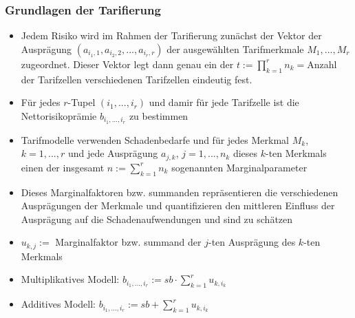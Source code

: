 \documentclass[12pt]{report}
\theoremstyle{dotless}
\theoremstyle{definition}
\begin{document}
\subsubsection{Grundlagen der Tarifierung}
\begin{itemize}
\item Jedem Risiko wird im Rahmen der Tarifierung zunächst der Vektor der Ausprägung $(a_{i_1,1}, a_{i_2, 2}, ..., a_{i_r, r})$ der ausgewählten Tarifmerkmale $M_1,...,M_r$ zugeordnet. Dieser Vektor legt dann genau ein der $t:= \prod_{k=1}^r n_k=$Anzahl der Tarifzellen verschiedenen Tarifzellen eindeutig fest.
\item Für jedes $r$-Tupel $(i_1, ..., i_r)$ und damir für jede Tarifzelle ist die Nettorisikoprämie $b_{i_1, ..., i_r}$ zu bestimmen
\item Tarifmodelle verwenden Schadenbedarfe und für jedes Merkmal $M_k$, $k=1,...,r$ und jede Ausprägung $a_{j,k}$, $j=1,...,n_k$ dieses $k$-ten Merkmals einen der insgesamt $n:= \sum_{k=1}^r n_k$ sogenannten Marginalparameter
\item Dieses Marginalfaktoren bzw. summanden repräsentieren die verschiedenen Ausprägungen der Merkmale und quantifizieren den mittleren Einfluss der Ausprägung auf die Schadenaufwendungen und sind zu schätzen
\item $u_{k,j}:=$ Marginalfaktor bzw. summand der $j$-ten Ausprägung des $k$-ten Merkmals
\item Multiplikatives Modell: $b_{i_1, ..., i_r}:= sb\cdot \sum_{k=1}^r u_{k,i_k}$
\item Additives Modell: $b_{i_1, ..., i_r} := sb + \sum_{k=1}^r u_{k, i_k}$
\end{itemize}
\end{document}
